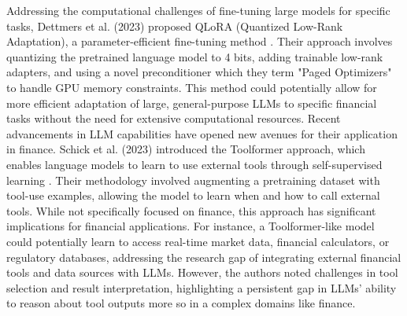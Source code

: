 \documentclass[logo,msc]{infthesis}           %
\begin{document}
Addressing the computational challenges of fine-tuning large models for specific tasks, Dettmers et al. (2023) proposed QLoRA (Quantized Low-Rank Adaptation), a parameter-efficient fine-tuning method \cite{dettmers2024qlora}. Their approach involves quantizing the pretrained language model to 4 bits, adding trainable low-rank adapters, and using a novel preconditioner which they term "Paged Optimizers" to handle GPU memory constraints. This method could potentially allow for more efficient adaptation of large, general-purpose LLMs to specific financial tasks without the need for extensive computational resources. 
Recent advancements in LLM capabilities have opened new avenues for their application in finance. Schick et al. (2023) introduced the Toolformer approach, which enables language models to learn to use external tools through self-supervised learning \cite{schick2023toolformer}. Their methodology involved augmenting a pretraining dataset with tool-use examples, allowing the model to learn when and how to call external tools. While not specifically focused on finance, this approach has significant implications for financial applications. For instance, a Toolformer-like model could potentially learn to access real-time market data, financial calculators, or regulatory databases, addressing the research gap of integrating external financial tools and data sources with LLMs. However, the authors noted challenges in tool selection and result interpretation, highlighting a persistent gap in LLMs' ability to reason about tool outputs more so in a complex domains like finance.
\end{document}
